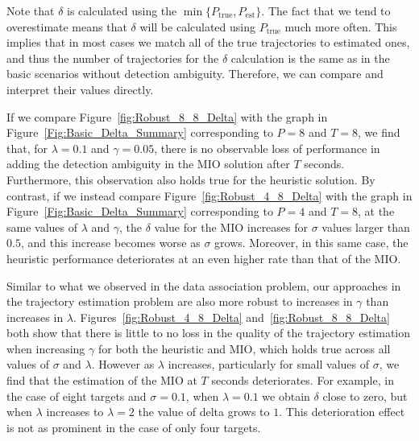 Note that $\delta$ is calculated using the $\min\{P_{\text{true}},P_{\text{est}}\}$. The fact that we tend to overestimate means that $\delta$ will be calculated using $P_{\text{true}}$ much more often. This implies that in most cases we match all of the true trajectories to estimated ones, and thus the number of trajectories for the $\delta$ calculation is the same as in the basic scenarios without detection ambiguity. Therefore, we can compare and interpret their values directly.

If we compare Figure~\ref{fig:Robust_8_8_Delta} with the graph in Figure~\ref{Fig:Basic_Delta_Summary} corresponding to $P=8$ and $T=8$, we find that, for $\lambda=0.1$ and $\gamma=0.05$, there is no observable loss of performance in adding the detection ambiguity in the MIO solution after $T$ seconds. Furthermore, this observation also holds true for the heuristic solution. By contrast, if we instead compare Figure~\ref{fig:Robust_4_8_Delta} with the graph in Figure~\ref{Fig:Basic_Delta_Summary} corresponding to $P=4$ and $T=8$, at the same values of $\lambda$ and $\gamma$, the $\delta$ value for the MIO increases for $\sigma$ values larger than $0.5$, and this increase becomes worse as $\sigma$ grows. Moreover, in this same case, the heuristic performance deteriorates at an even higher rate than that of the MIO. 

Similar to what we observed in the data association problem, our approaches in the trajectory estimation problem are also more robust to increases in $\gamma$ than increases in $\lambda$. Figures~\ref{fig:Robust_4_8_Delta} and~\ref{fig:Robust_8_8_Delta} both show that there is little to no loss in the quality of the trajectory estimation when increasing $\gamma$ for both the heuristic and MIO, which holds true across all values of $\sigma$ and $\lambda$. However as $\lambda$ increases, particularly for small values of $\sigma$, we find that the estimation of the MIO at $T$ seconds deteriorates. For example, in the case of eight targets and $\sigma=0.1$, when $\lambda=0.1$ we obtain $\delta$ close to zero, but when $\lambda$ increases to $\lambda=2$ the value of delta grows to $1$. This deterioration effect is not as prominent in the case of only four targets.

